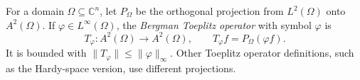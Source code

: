 
For a domain $\Omega\subseteq\mathbb C^n$, let $P_\Omega$ be the orthogonal projection from $L^2(\Omega)$ onto $A^2(\Omega)$. If $\varphi\in L^\infty(\Omega)$, the \emph{Bergman Toeplitz operator} with symbol $\varphi$ is
\[
T_\varphi:A^2(\Omega)\to A^2(\Omega),\qquad T_\varphi f=P_\Omega(\varphi f).
\]
It is bounded with $\|T_\varphi\|\le\|\varphi\|_\infty$. Other Toeplitz operator definitions, such as the Hardy-space version, use different projections.
